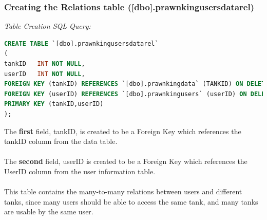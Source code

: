 \documentclass[a4paper,11pt]{proc}
\begin{document}
\subsubsection{Creating the Relations table ([dbo].prawnkingusersdatarel)}
\textit{Table Creation SQL Query:}
\begin{lstlisting}[language=SQL,
deletekeywords={IDENTITY,INT},
morekeywords={clustered,LONGETXT},    
framesep=10pt,
framextopmargin=10pt]
CREATE TABLE `[dbo].prawnkingusersdatarel`
(
tankID   INT NOT NULL,
userID   INT NOT NULL,
FOREIGN KEY (tankID) REFERENCES `[dbo].prawnkingdata` (TANKID) ON DELETE RESTRICT ON UPDATE CASCADE,
FOREIGN KEY (userID) REFERENCES `[dbo].prawnkingusers` (userID) ON DELETE RESTRICT ON UPDATE CASCADE,
PRIMARY KEY (tankID,userID)
);
\end{lstlisting}
The \textbf{first} field, tankID, is created to be a Foreign Key which references the tankID column from the data table.\\
\\The \textbf{second} field, userID is created to be a Foreign Key which references the UserID column from the user information table.\\
\\This table contains the many-to-many relations between users and different tanks, since many users should be able to access the same tank, and many tanks are usable by the same user.
\end{document}
